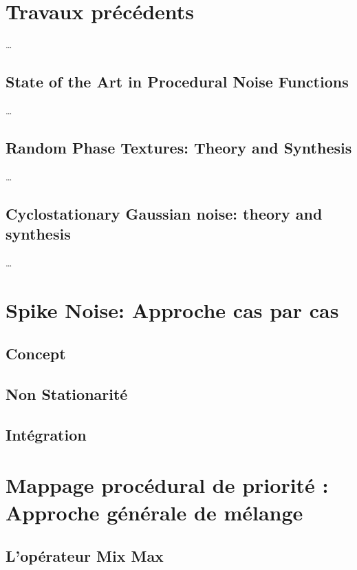 \documentclass[twocolumn]{article} %
\begin{document}
\section{Travaux précédents}
\ldots

\subsection{State of the Art in Procedural Noise Functions}
\ldots

\subsection{Random Phase Textures: Theory and Synthesis}
\ldots

\subsection{Cyclostationary Gaussian noise: theory and synthesis}
\ldots

\section{Spike Noise: Approche cas par cas}

\subsection{Concept}

\subsection{Non Stationarité}

\subsection{Intégration}

\section{Mappage procédural de priorité : Approche générale de mélange}

\subsection{L'opérateur Mix Max}
\end{document}
